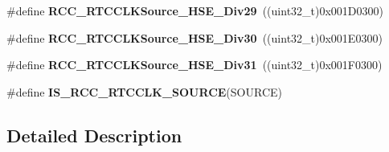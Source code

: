 \begin{DoxyCompactItemize}
\#define {\bfseries R\+C\+C\+\_\+\+R\+T\+C\+C\+L\+K\+Source\+\_\+\+H\+S\+E\+\_\+\+Div29}~((uint32\+\_\+t)0x001\+D0300)
\item 
\mbox{\label{group___r_c_c___r_t_c___clock___source_gaefbdc4c8ec371e4db2e50953bde4ff03}} 
\#define {\bfseries R\+C\+C\+\_\+\+R\+T\+C\+C\+L\+K\+Source\+\_\+\+H\+S\+E\+\_\+\+Div30}~((uint32\+\_\+t)0x001\+E0300)
\item 
\mbox{\label{group___r_c_c___r_t_c___clock___source_gab0701b60d52999b20b3d7e52ae452cf0}} 
\#define {\bfseries R\+C\+C\+\_\+\+R\+T\+C\+C\+L\+K\+Source\+\_\+\+H\+S\+E\+\_\+\+Div31}~((uint32\+\_\+t)0x001\+F0300)
\item 
\mbox{\label{group___r_c_c___r_t_c___clock___source_gae76a0340b02b5342e756fa0d2112ebf5}} 
\#define {\bfseries I\+S\+\_\+\+R\+C\+C\+\_\+\+R\+T\+C\+C\+L\+K\+\_\+\+S\+O\+U\+R\+CE}(S\+O\+U\+R\+CE)
\end{DoxyCompactItemize}


\subsection{Detailed Description}
